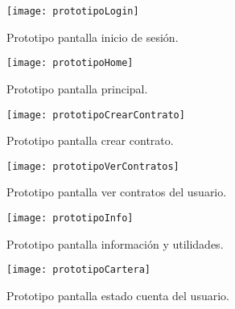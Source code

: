 \begin{figure}[h]
	
	\centering
	\texttt{[image: prototipoLogin]}
	\caption[Prototipo pantalla inicio de sesión]{Prototipo pantalla inicio de sesión.}
	\label{fig:prototipoLogin}
\end{figure}

\begin{figure}[h]
	\label{img:prototipoHome}
	\centering
	\texttt{[image: prototipoHome]}
	\caption[Prototipo pantalla principal]{Prototipo pantalla principal.}
\end{figure}

\begin{figure}[h]
	\label{img:prototipoCrearContrato}
	\centering
	\texttt{[image: prototipoCrearContrato]}
	\caption[Prototipo pantalla crear contrato]{Prototipo pantalla crear contrato.}
\end{figure}

\begin{figure}[h]
	\label{img:prototipoVerContratos}
	\centering
	\texttt{[image: prototipoVerContratos]}
	\caption[Prototipo pantalla ver contratos del usuario]{Prototipo pantalla ver contratos del usuario.}
\end{figure}

\begin{figure}[h]
	\label{img:prototipoInfo}
	\centering
	\texttt{[image: prototipoInfo]}
	\caption[Prototipo pantalla información y utilidades]{Prototipo pantalla información y utilidades.}
\end{figure}

\begin{figure}[h]
	\label{img:prototipoCartera}
	\centering
	\texttt{[image: prototipoCartera]}
	\caption[Prototipo pantalla estado cuenta del usuario]{Prototipo pantalla estado cuenta del usuario.}
\end{figure}
